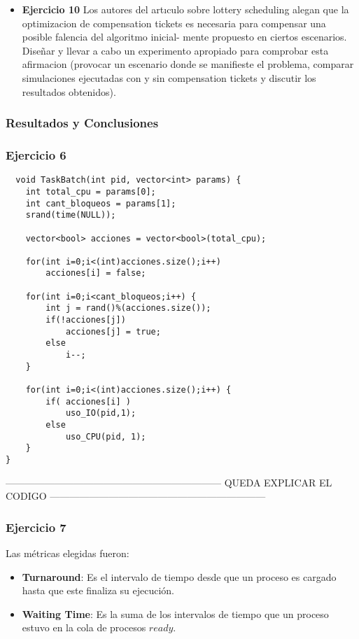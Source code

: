 \begin{itemize}
\item \textbf{Ejercicio 10} Los autores del artıculo sobre lottery scheduling alegan que la optimizacion de
compensation tickets es necesaria para compensar una posible falencia del algoritmo inicial-
mente propuesto en ciertos escenarios. Diseñar y llevar a cabo un experimento apropiado para
comprobar esta afirmacion (provocar un escenario donde se manifieste el problema, comparar
simulaciones ejecutadas con y sin compensation tickets y discutir los resultados obtenidos).

\end{itemize}
\subsubsection{Resultados y Conclusiones}

\subsubsection[]{Ejercicio 6}
 \begin{verbatim}
  void TaskBatch(int pid, vector<int> params) {
	int total_cpu = params[0];
	int cant_bloqueos = params[1];
	srand(time(NULL));
	
	vector<bool> acciones = vector<bool>(total_cpu);
	 
	for(int i=0;i<(int)acciones.size();i++) 
		acciones[i] = false;
		
	for(int i=0;i<cant_bloqueos;i++) {
		int j = rand()%(acciones.size());
		if(!acciones[j])
			acciones[j] = true;
		else
			i--; 
	}

	for(int i=0;i<(int)acciones.size();i++) {
		if( acciones[i] )
			uso_IO(pid,1); 
		else
			uso_CPU(pid, 1); 
	}
}
 \end{verbatim}
 ------------------------------------------------------------------
 QUEDA EXPLICAR EL CODIGO
------------------------------------------------------------------
 \subsubsection[]{Ejercicio 7}
 Las métricas elegidas fueron:
\begin{itemize}
 \item \textbf{Turnaround}: Es el intervalo de tiempo desde que un proceso es cargado hasta que este finaliza su ejecución.
 \item \textbf{Waiting Time}: Es la suma de los intervalos de tiempo que un proceso estuvo en la cola de procesos $ready$.
\end{itemize}
 
